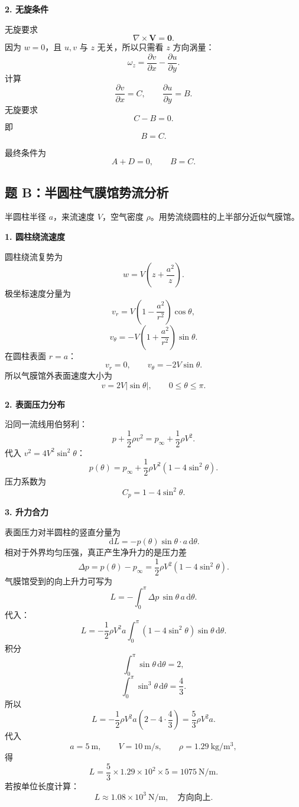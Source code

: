 \documentclass[UTF8,zihao=-4]{ctexart}
\newcommand{\dd}{\,\mathrm d}
\begin{document}
\textbf{2. 无旋条件}

无旋要求
\[
\nabla\times\bm V=\bm0.
\]
因为 \(w=0\)，且 \(u,v\) 与 \(z\) 无关，所以只需看 \(z\) 方向涡量：
\[
\omega_z=\frac{\partial v}{\partial x}-\frac{\partial u}{\partial y}.
\]
计算
\[
\frac{\partial v}{\partial x}=C,\qquad
\frac{\partial u}{\partial y}=B.
\]
无旋要求
\[
C-B=0.
\]
即
\[
\boxed{B=C.}
\]

最终条件为
\[
\boxed{A+D=0,\qquad B=C.}
\]

\subsection*{题 B：半圆柱气膜馆势流分析}

半圆柱半径 \(a\)，来流速度 \(V\)，空气密度 \(\rho\)。用势流绕圆柱的上半部分近似气膜馆。

\textbf{1. 圆柱绕流速度}

圆柱绕流复势为
\[
w=V\left(z+\frac{a^2}{z}\right).
\]
极坐标速度分量为
\[
v_r=V\left(1-\frac{a^2}{r^2}\right)\cos\theta,
\]
\[
v_\theta=-V\left(1+\frac{a^2}{r^2}\right)\sin\theta.
\]
在圆柱表面 \(r=a\)：
\[
v_r=0,\qquad
\boxed{v_\theta=-2V\sin\theta.}
\]
所以气膜馆外表面速度大小为
\[
\boxed{v=2V|\sin\theta|,\qquad 0\le\theta\le\pi.}
\]

\textbf{2. 表面压力分布}

沿同一流线用伯努利：
\[
p+\frac12\rho v^2=p_\infty+\frac12\rho V^2.
\]
代入 \(v^2=4V^2\sin^2\theta\)：
\[
\boxed{
p(\theta)=p_\infty+\frac12\rho V^2
\left(1-4\sin^2\theta\right).}
\]
压力系数为
\[
\boxed{C_p=1-4\sin^2\theta.}
\]

\textbf{3. 升力合力}

表面压力对半圆柱的竖直分量为
\[
\dd L= -p(\theta)\sin\theta\cdot a\dd\theta .
\]
相对于外界均匀压强，真正产生净升力的是压力差
\[
\Delta p=p(\theta)-p_\infty
=\frac12\rho V^2(1-4\sin^2\theta).
\]
气膜馆受到的向上升力可写为
\[
L=-\int_0^\pi \Delta p\,\sin\theta\,a\dd\theta .
\]
代入：
\[
L=-\frac12\rho V^2a
\int_0^\pi(1-4\sin^2\theta)\sin\theta\dd\theta .
\]
积分
\[
\int_0^\pi\sin\theta\dd\theta=2,
\]
\[
\int_0^\pi\sin^3\theta\dd\theta=\frac43.
\]
所以
\[
L=-\frac12\rho V^2a\left(2-4\cdot\frac43\right)
=\frac53\rho V^2a .
\]
代入
\[
a=5\ \mathrm m,\qquad V=10\ \mathrm{m/s},\qquad
\rho=1.29\ \mathrm{kg/m^3},
\]
得
\[
L=\frac53\times1.29\times10^2\times5
=1075\ \mathrm{N/m}.
\]
若按单位长度计算：
\[
\boxed{L\approx1.08\times10^3\ \mathrm{N/m},\quad \text{方向向上}.}
\]
\end{document}
